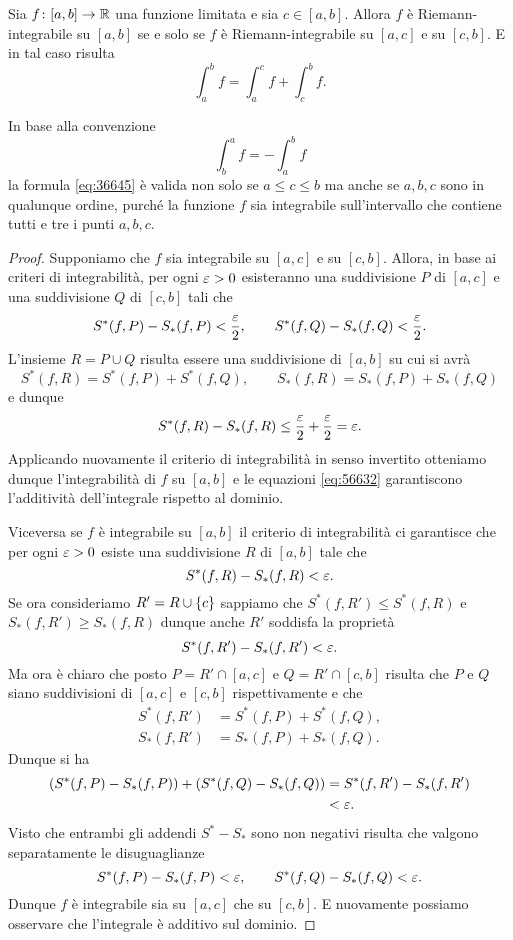 \begin{theorem}
\mymark{*}%
%
%
\label{th:additivita_integrale}%
Sia $f\colon [a,b]\to {\mathbb R}$ una funzione limitata e sia $c\in [a,b]$.
Allora $f$ è Riemann-integrabile su $[a,b]$ se e solo se
$f$ è Riemann-integrabile su $[a,c]$ e su $[c,b]$.
E in tal caso risulta
\begin{equation}\label{eq:36645}
 \int_a^b f = \int_a^c f + \int_c^b f.
\end{equation}

In base alla convenzione
\[
   \int_b^a f = -\int_a^b f
\]
la formula \eqref{eq:36645} è valida non solo se $a\le c\le b$ ma anche
se $a,b,c$ sono in qualunque ordine, purché la funzione $f$ sia integrabile
sull'intervallo che contiene tutti e tre i punti $a,b,c$.
\end{theorem}
%
\begin{proof}
\mymark{*}
Supponiamo che $f$ sia integrabile su $[a,c]$ e su $[c,b]$.
Allora, in base ai criteri di integrabilità, per ogni $\varepsilon>0$ esisteranno una
suddivisione $P$ di $[a,c]$ e una suddivisione $Q$ di $[c,b]$ tali che
\[
  S^*(f,P) - S_*(f,P) < \frac {\varepsilon} 2,
  \qquad
  S^*(f,Q) - S_*(f,Q) < \frac {\varepsilon} 2.
\]
L'insieme $R=P\cup Q$ risulta essere una suddivisione di $[a,b]$ su cui si avrà
\begin{equation}\label{eq:56632}
S^*(f,R) = S^*(f,P) + S^*(f,Q), \qquad
S_*(f,R) = S_*(f,P) + S_*(f,Q)
\end{equation}
e dunque
\[
S^*(f,R) - S_*(f,R) \le \frac {\varepsilon} 2 + \frac {\varepsilon} 2 = \varepsilon.
\]
Applicando nuovamente il criterio di integrabilità in senso invertito otteniamo
dunque l'integrabilità di $f$ su $[a,b]$ e le equazioni
\eqref{eq:56632} garantiscono l'additività dell'integrale rispetto al dominio.

Viceversa se $f$ è integrabile su $[a,b]$ il criterio di integrabilità
ci garantisce che per ogni $\varepsilon>0$ esiste una suddivisione $R$ di $[a,b]$ tale che
\[
S^*(f,R) - S_*(f,R) < \varepsilon.
\]
Se ora consideriamo $R' = R \cup {\left\{ c \right\}}$ sappiamo che $S^*(f,R') \le S^*(f,R)$
e $S_*(f,R') \ge S_*(f,R)$ dunque anche $R'$ soddisfa la proprietà
\[
S^*(f,R') - S_*(f,R') < \varepsilon.
\]
Ma ora è chiaro che posto $P=R'\cap[a,c]$ e $Q=R'\cap[c,b]$ risulta che $P$
e $Q$ siano suddivisioni di $[a,c]$ e $[c,b]$ rispettivamente e che
\begin{align*}
  S^*(f,R') &= S^*(f,P) + S^*(f,Q), \\
  S_*(f,R') &= S_*(f,P) + S_*(f,Q).
\end{align*}
Dunque si ha
\begin{align*}
(S^*(f,P) - S_*(f,P)) + (S^*(f,Q) - S_*(f,Q))
&= S^*(f,R') - S_*(f,R') \\
&< \varepsilon.
\end{align*}
Visto che entrambi gli addendi $S^*-S_*$ sono non negativi
risulta che valgono separatamente le disuguaglianze
\[
S^*(f,P) - S_*(f,P) < \varepsilon, \qquad
S^*(f,Q) - S_*(f,Q) < \varepsilon.
\]
Dunque $f$ è integrabile sia su $[a,c]$ che su $[c,b]$.
E nuovamente possiamo osservare che l'integrale è additivo sul dominio.
\end{proof}

